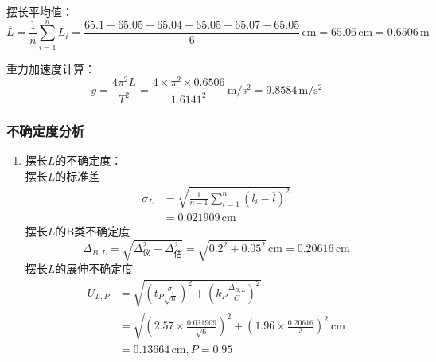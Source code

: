 \documentclass[12pt,a4paper]{article}
\begin{document}
            摆长平均值：
            \[
                \overline{L}=\frac{1}{n}\sum_{i=1}^{n}L_i=\frac{65.1+65.05+65.04+65.05+65.07+65.05}{6}\,\mathrm{cm}=65.06\,\mathrm{cm}=0.6506\,\mathrm{m}
            \]
            
            重力加速度计算：
            \[
                g=\frac{4 \pi^{2} L}{T^{2}}=\frac{4\times \pi^2\times 0.6506}{1.6141^2}\,\mathrm{m/s^2}=9.8584\,\mathrm{m/s^2}
            \]

        \subsubsection{不确定度分析}
            \begin{enumerate}
                \item 摆长$L$的不确定度： \\
                摆长$L$的标准差
                \[
                    \begin{aligned}
                        \sigma_{L}&=\sqrt{\frac{1}{n-1}\sum_{i=1}^n\left(l_i-\overline{l}\right)^2} \\
                        &=0.021909\,\mathrm{cm}
                    \end{aligned}
                \]
                摆长$L$的B类不确定度
                \[
                    \Delta_{B,L}=\sqrt{\Delta_\text{仪}^2+\Delta_\text{估}^2}=\sqrt{0.2^2+0.05^2}\,\mathrm{cm}=0.20616\,\mathrm{cm}
                \]
                摆长$L$的展伸不确定度
                \[
                    \begin{aligned}
                        U_{L,P}&=\sqrt{\left(t_P\frac{\sigma_{l}}{\sqrt{n}}\right)^2+\left(k_P\frac{\Delta_{B,L}}{C}\right)^2} \\
                        &=\sqrt{\left(2.57\times\frac{0.021909}{\sqrt{6}}\right)^2+\left(1.96\times\frac{0.20616}{3}\right)^2}\,\mathrm{cm} \\
                        &=0.13664\,\mathrm{cm},P=0.95
                    \end{aligned}
                \]


\end{enumerate}
\end{document}
